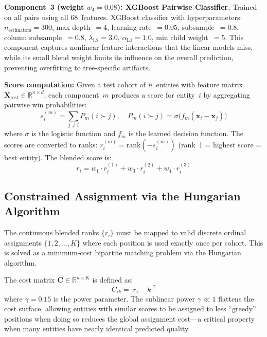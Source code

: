 \documentclass[conference]{IEEEtran}
\begin{document}
\textbf{Component~3 (weight $w_4 = 0.08$): XGBoost Pairwise Classifier.}
Trained on all pairs using all 68~features. XGBoost classifier with hyperparameters: $n_{\text{estimators}} = 300$, max depth~$= 4$, learning rate~$= 0.05$, subsample~$= 0.8$, column subsample~$= 0.8$, $\lambda_{\text{L2}} = 3.0$, $\alpha_{\text{L1}} = 1.0$, min child weight~$= 5$. This component captures nonlinear feature interactions that the linear models miss, while its small blend weight limits its influence on the overall prediction, preventing overfitting to tree-specific artifacts.

\textbf{Score computation:} Given a test cohort of $n$~entities with feature matrix $\mathbf{X}_{\text{test}} \in \mathbb{R}^{n \times d}$, each component~$m$ produces a score for entity~$i$ by aggregating pairwise win probabilities:
\begin{equation}
s_i^{(m)} = \sum_{j \neq i} P_m(i \succ j), \quad P_m(i \succ j) = \sigma\!\bigl(f_m(\mathbf{x}_i - \mathbf{x}_j)\bigr)
\label{eq:score}
\end{equation}
where $\sigma$ is the logistic function and $f_m$ is the learned decision function. The scores are converted to ranks: $r_i^{(m)} = \text{rank}(-s_i^{(m)})$ (rank~1 = highest score = best entity). The blended score is:
\begin{equation}
r_i = w_1 \cdot r_i^{(1)} + w_3 \cdot r_i^{(2)} + w_4 \cdot r_i^{(3)}
\label{eq:blend}
\end{equation}

\subsection{Constrained Assignment via the Hungarian Algorithm}

The continuous blended ranks $\{r_i\}$ must be mapped to valid discrete ordinal assignments $\{1, 2, \ldots, K\}$ where each position is used exactly once per cohort. This is solved as a minimum-cost bipartite matching problem via the Hungarian algorithm.

The cost matrix $\mathbf{C} \in \mathbb{R}^{n \times K}$ is defined as:
\begin{equation}
C_{ik} = |r_i - k|^{\gamma}
\label{eq:cost}
\end{equation}
where $\gamma = 0.15$ is the power parameter. The sublinear power $\gamma \ll 1$ flattens the cost surface, allowing entities with similar scores to be assigned to less ``greedy'' positions when doing so reduces the global assignment cost---a critical property when many entities have nearly identical predicted quality.
\end{document}
